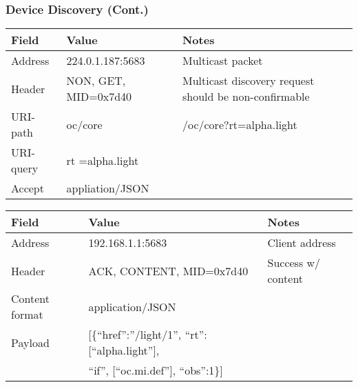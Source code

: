 \documentclass{beamer}
\begin{document}
\begin{frame}[fragile]
\frametitle{Device Discovery (Cont.)}


\vspace*{0.1cm}

{\scriptsize
{\begin{tabular}{|l|l|p{5cm}|} \hline
Field & Value & Notes \\ \hline
Address &  224.0.1.187:5683 & Multicast packet \\
Header & NON, GET, MID=0x7d40 & Multicast discovery request should be
non-confirmable \\
URI-path & oc/core & /oc/core?rt=alpha.light \\
URI-query & rt =alpha.light & \\ 
Accept & appliation/JSON & \\ \hline
\end{tabular}}
}

\vspace*{0.3cm}


\vspace*{0.1cm}

{\scriptsize
{\begin{tabular}{|l|l|p{3cm}|} \hline
Field & Value & Notes \\ \hline
Address &  192.168.1.1:5683 & Client address \\
Header & ACK, CONTENT, MID=0x7d40 & Success w/ content \\
Content format & application/JSON & \\
Payload & [\{``href'':''/light/1'', ``rt'':[``alpha.light''], &  \\
  & ``if'',
    [``oc.mi.def''], ``obs'':1\}] & \\ \hline
\end{tabular}}
}

\end{frame}
\end{document}
